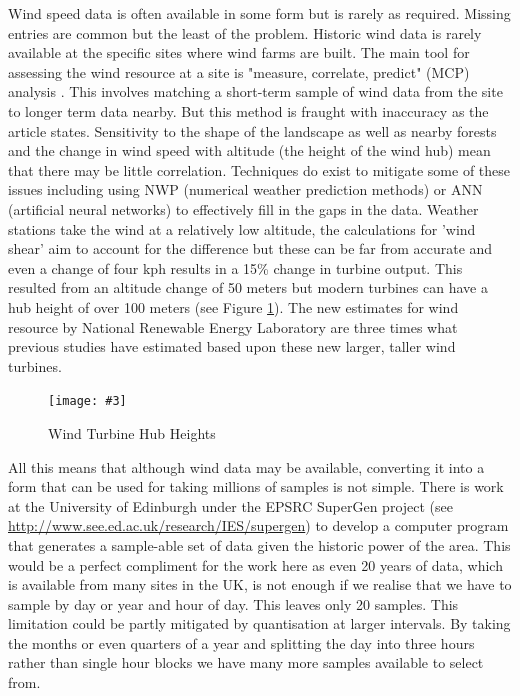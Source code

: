 \documentclass[a4paper,oneside,12pt]{report}
\newcommand{\image}[3] {
  \begin{figure}
    \begin{center}
      \texttt{[image: \#3]}
      \caption{#2}
      \label{#1}
    \end{center}
  \end{figure}
}
\newenvironment{vivacorrections}
{}
{}
\newcommand{\cmdvivacorrections}[1]
{#1}
\begin{document}
Wind speed data is often available in some form but is rarely as required. Missing entries are common but the least of the problem. Historic wind data is rarely available at the specific sites where wind farms are built. The main tool for assessing the wind resource at a site is "measure, correlate, predict" (MCP) analysis \cite{Economist2010}. This involves matching a short-term sample of wind data from the site to longer term data nearby. But this method is fraught with inaccuracy as the article states. Sensitivity to the shape of the landscape as well as nearby forests and the change in wind speed with altitude (the height of the wind hub) mean that there may be little correlation. Techniques do exist to mitigate some of these issues including using NWP (numerical weather prediction methods) or ANN (artificial neural networks) to effectively fill in the gaps in the data. Weather stations take the wind at a relatively low altitude, the calculations for 'wind shear' aim to account for the difference but these can be far from accurate and even a change of four kph results in a 15\% change in turbine output. This resulted from an altitude change of 50 meters but modern turbines can have a hub height of over 100 meters \cmdvivacorrections{(see Figure \ref{HistoricBladeSize2})}. The new estimates for wind resource by National Renewable Energy Laboratory \cite{NationalRenewableEnergyLaboratory2010} are three times what previous studies have estimated based upon these new larger, taller wind turbines.

\image{HistoricBladeSize2}{Wind Turbine Hub Heights \cite{BWEA2005f}}{windhubheight.png}

\begin{vivacorrections}
All this means that although wind data may be available, converting it into a form that can be used for taking millions of samples is not simple.  There is work at the University of Edinburgh under the EPSRC SuperGen project (see \url{http://www.see.ed.ac.uk/research/IES/supergen}) to develop a computer program that generates a sample-able set of data given the historic power of the area. This would be a perfect compliment for the work here as even 20 years of data, which is available from many sites in the UK, is not enough if we realise that we have to sample by day or year and hour of day. This leaves only 20 samples. This limitation could be partly mitigated by quantisation at larger intervals. By taking the months or even quarters of a year and splitting the day into three hours rather than single hour blocks we have many more samples available to select from.
\end{vivacorrections}
\end{document}
